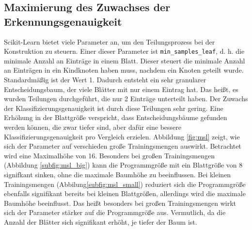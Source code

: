 \subsection{Maximierung des Zuwachses der Erkennungsgenauigkeit}
Scikit-Learn bietet viele Parameter an, um den Teilungsprozess bei der Konstruktion zu steuern. Einer dieser Parameter ist \texttt{min\_samples\_leaf}, d. h. die minimale Anzahl an Einträge in einem Blatt.
Dieser steuert die minimale Anzahl an Einträgen in ein Kindknoten haben muss, nachdem ein Knoten geteilt wurde. Standardmäßig ist der Wert 1. Dadurch entsteht ein sehr granularer Entscheidungsbaum,
der viele Blätter mit nur einem Eintrag hat. Das heißt, es wurden Teilungen durchgeführt, die nur 2 Einträge unterteilt haben. Der Zuwachs der Klassifizierungsgenauigkeit ist durch diese Teilungen sehr gering.
Eine Erhöhung in der Blattgröße verspricht, dass Entscheidungsbäume gefunden werden können, die zwar tiefer sind, aber dafür eine bessere Klassifizierungsgenauigkeit pro Vergleich erzielen.
\newline
\newline
Abbildung \ref{fig:msl} zeigt, wie sich der Parameter auf verschieden große Trainingsmengen auswirkt. Betrachtet wird eine Maximalhöhe von 16. Besonders bei großen Trainingsmengen (Abbildung \ref{subfig:msl_big})
kann die Programmgröße mit ein Blattgröße von 8 signifkant sinken, ohne die maximale Baumhöhe zu beeinflussen. Bei kleinen Trainingsmengen (Abbilung\ref{subfig:msl_small}) reduziert sich die Programmgröße
ebenfalls signifikant bereits bei kleinen Blattgrößen, allerdings wird die maximale Baumhöhe beeinflusst. Das heißt besonders bei großen Trainingsmengen wirkt sich der Parameter stärker auf die Programmgröße aus.
Vermutlich, da die Anzahl der Blätter sich signifikant erhöht, je tiefer der Baum ist.
